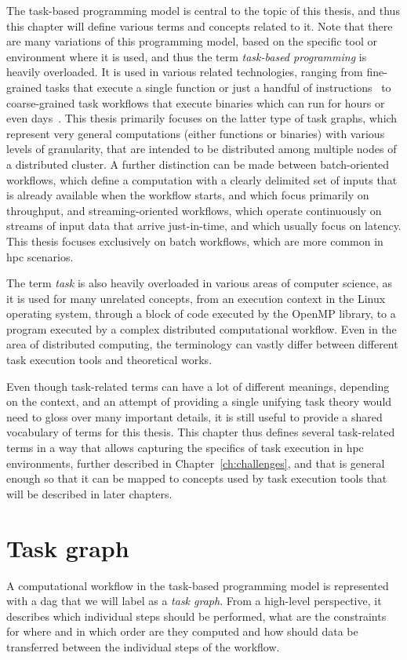 The task-based programming model is central to the topic of this thesis, and thus this chapter will
define various terms and concepts related to it. Note that there are many variations of this
programming model, based on the specific tool or environment where it is used, and thus the term
\emph{task-based programming} is heavily overloaded. It is used in various related technologies, ranging
from fine-grained tasks that execute a single function or just a handful of
instructions~\cite{starpu,openmp} to coarse-grained task workflows that execute binaries which
can run for hours or even days~\cite{dask, snakemake, nextflow}. This thesis primarily focuses on the latter
type of task graphs, which represent very general computations (either functions or binaries) with
various levels of granularity, that are intended to be distributed among multiple nodes of a
distributed cluster. A further distinction can be made between batch-oriented workflows, which
define a computation with a clearly delimited set of inputs that is already available when the
workflow starts, and which focus primarily on throughput, and streaming-oriented workflows, which
operate continuously on streams of input data that arrive just-in-time, and which usually focus on
latency. This thesis focuses exclusively on batch workflows, which are more common in
\gls{hpc} scenarios.

The term \emph{task} is also heavily overloaded in various areas of computer science, as
it is used for many unrelated concepts, from an execution context in the Linux operating system,
through a block of code executed by the OpenMP library, to a program executed by a complex
distributed computational workflow. Even in the area of distributed computing, the terminology can
vastly differ between different task execution tools and theoretical works.

Even though task-related terms can have a lot of different meanings, depending on the context, and
an attempt of providing a single unifying task theory would need to gloss over many important
details, it is still useful to provide a shared vocabulary of terms for this thesis. This chapter
thus defines several task-related terms in a way that allows capturing the specifics of task
execution in \gls{hpc} environments, further described in
Chapter~\ref{ch:challenges}, and that is general enough so that it can be mapped to concepts
used by task execution tools that will be described in later chapters.

\section{Task graph}
A computational workflow in the task-based programming model is represented with a
\gls{dag} that we will label as a \emph{task graph}. From a high-level
perspective, it describes which individual steps should be performed, what are the constraints for
where and in which order are they computed and how should data be transferred between the
individual steps of the workflow.

